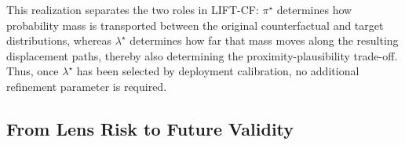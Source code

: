 This realization separates the two roles in LIFT-CF:
$\pi^\star$ determines how probability mass is transported between
the original counterfactual and target distributions, whereas
$\lambda^\star$ determines how far that mass moves along the
resulting displacement paths, thereby also determining the proximity-plausibility trade-off. Thus, once $\lambda^\star$ has been
selected by deployment calibration, no additional refinement
parameter is required.
\iffalse
\subsection{From Lens Risk to Future Validity}
\label{sec:future_validity}






